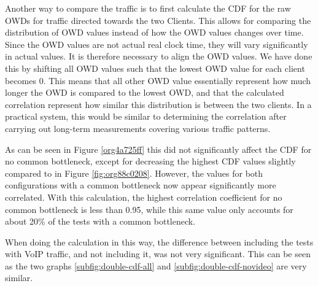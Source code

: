 \documentclass[a4paper,11pt]{article}
\begin{document}
Another way to compare the traffic is to first calculate the CDF for the raw OWDs for traffic directed towards the two Clients. This allows for comparing the distribution of OWD values instead of how the OWD values changes over time. Since the OWD values are not actual real clock time, they will vary significantly in actual values. It is therefore necessary to align the OWD values. We have done this by shifting all OWD values such that the lowest OWD value for each client becomes 0. This means that all other OWD value essentially represent how much longer the OWD is compared to the lowest OWD, and that the calculated correlation represent how similar this distribution is between the two clients. In a practical system, this would be similar to determining the correlation after carrying out long-term measurements covering various traffic patterns.

As can be seen in Figure \ref{org4a725ff} this did not significantly affect the CDF for no common bottleneck, except for decreasing the highest CDF values slightly compared to in Figure \ref{fig:org88c0208}. However, the values for both configurations with a common bottleneck now appear significantly more correlated. With this calculation, the highest correlation coefficient for no common bottleneck is less than 0.95, while this same value only accounts for about 20\% of the tests with a common bottleneck.

When doing the calculation in this way, the difference between including the tests with VoIP traffic, and not including it, was not very significant. This can be seen as the two graphs \ref{subfig:double-cdf-all} and \ref{subfig:double-cdf-novideo} are very similar.
\end{document}
